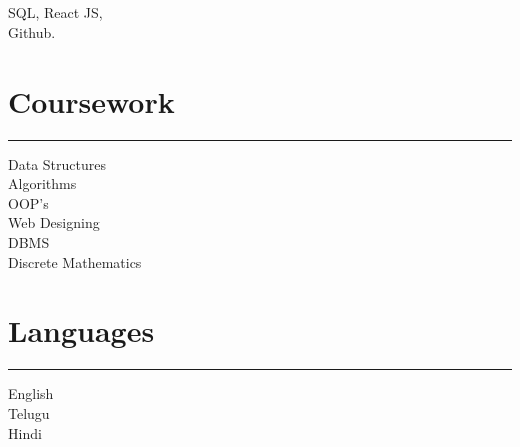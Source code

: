 \documentclass[]{sundar}
\begin{document}
\begin{minipage}[t]{0.33\textwidth}
\subsection{}
\vspace{3pt}
SQL, React JS,\\
 Github.\\
\vspace{6pt}

\sectionsep
\section{Coursework}
\noindent\rule{5cm}{0.4pt}

Data Structures\\
Algorithms\\
OOP's\\
Web Designing\\
DBMS\\
Discrete Mathematics\\
\vspace{6pt}

\sectionsep

\section{Languages}
\noindent\rule{5cm}{0.4pt}

English \\
Telugu \\
Hindi 
\sectionsep

%
%

\end{minipage} 
\hfill
\end{document}
